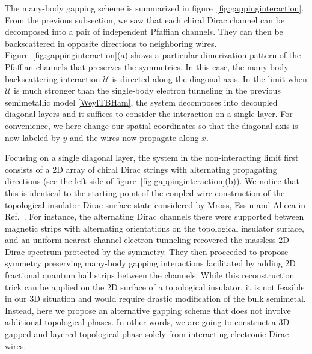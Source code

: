 The many-body gapping scheme is summarized in figure~\ref{fig:gappinginteraction}. From the previous subsection, we saw that each chiral Dirac channel can be decomposed into a pair of independent Pfaffian channels. They can then be backscattered in opposite directions to neighboring wires. Figure~\ref{fig:gappinginteraction}(a) shows a particular dimerization pattern of the Pfaffian channels that preserves the symmetries. In this case, the many-body backscattering interaction $\mathcal{U}$ is directed along the diagonal axis. In the limit when $\mathcal{U}$ is much stronger than the single-body electron tunneling in the previous semimetallic model \eqref{WeylTBHam}, the system decomposes into decoupled diagonal layers and it suffices to consider the interaction on a single layer. For convenience, we here change our spatial coordinates so that the diagonal axis is now labeled by $y$ and the wires now propagate along $x$.

Focusing on a single diagonal layer, the system in the non-interacting limit first consists of a 2D array of chiral Dirac strings with alternating propagating directions (see the left side of figure~\ref{fig:gappinginteraction}(b)). We notice that this is identical to the starting point of the coupled wire construction of the topological insulator Dirac surface state considered by Mross, Essin and Alicea in Ref.~. For instance, the alternating Dirac channels there were supported between magnetic strips with alternating orientations on the topological insulator surface, and an uniform nearest-channel electron tunneling recovered the massless 2D Dirac spectrum protected by the \AFTR symmetry. They then proceeded to propose symmetry preserving many-body gapping interactions facilitated by adding 2D fractional quantum hall strips between the channels. While this reconstruction trick can be applied on the 2D surface of a topological insulator, it is not feasible in our 3D situation and would require drastic modification of the bulk semimetal. Instead, here we propose an alternative gapping scheme that does not involve additional topological phases. In other words, we are going to construct a 3D gapped and layered topological phase solely from interacting electronic Dirac wires.

